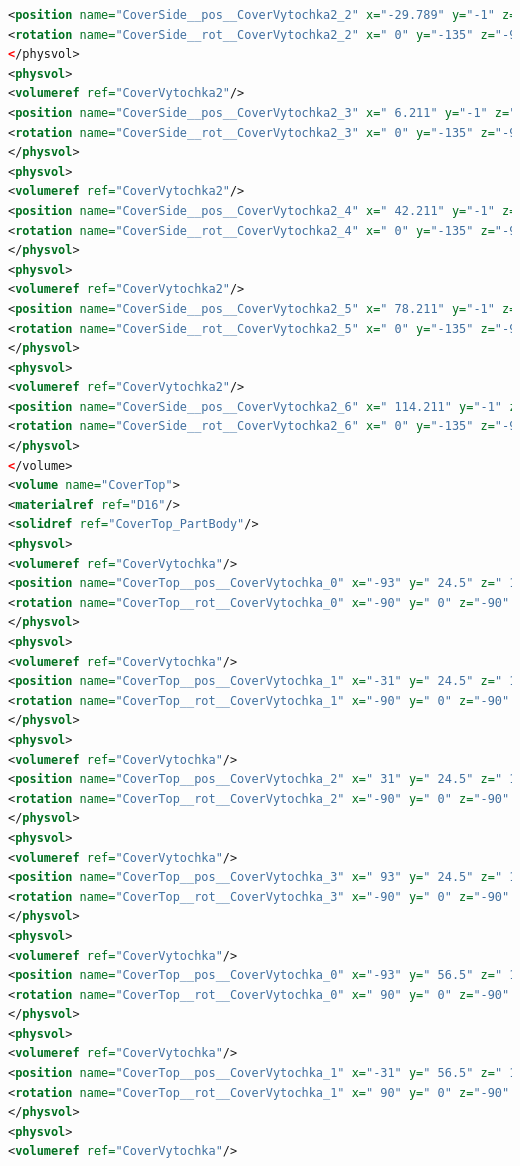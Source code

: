 \begin{lstlisting}[language=XML, firstline=1, lastline=89]
<position name="CoverSide__pos__CoverVytochka2_2" x="-29.789" y="-1" z="-20.499" unit="mm"/>
<rotation name="CoverSide__rot__CoverVytochka2_2" x=" 0" y="-135" z="-90" unit="deg"/>
</physvol>
<physvol>
<volumeref ref="CoverVytochka2"/>
<position name="CoverSide__pos__CoverVytochka2_3" x=" 6.211" y="-1" z="-20.499" unit="mm"/>
<rotation name="CoverSide__rot__CoverVytochka2_3" x=" 0" y="-135" z="-90" unit="deg"/>
</physvol>
<physvol>
<volumeref ref="CoverVytochka2"/>
<position name="CoverSide__pos__CoverVytochka2_4" x=" 42.211" y="-1" z="-20.499" unit="mm"/>
<rotation name="CoverSide__rot__CoverVytochka2_4" x=" 0" y="-135" z="-90" unit="deg"/>
</physvol>
<physvol>
<volumeref ref="CoverVytochka2"/>
<position name="CoverSide__pos__CoverVytochka2_5" x=" 78.211" y="-1" z="-20.499" unit="mm"/>
<rotation name="CoverSide__rot__CoverVytochka2_5" x=" 0" y="-135" z="-90" unit="deg"/>
</physvol>
<physvol>
<volumeref ref="CoverVytochka2"/>
<position name="CoverSide__pos__CoverVytochka2_6" x=" 114.211" y="-1" z="-20.499" unit="mm"/>
<rotation name="CoverSide__rot__CoverVytochka2_6" x=" 0" y="-135" z="-90" unit="deg"/>
</physvol>
</volume>
<volume name="CoverTop">
<materialref ref="D16"/>
<solidref ref="CoverTop_PartBody"/>
<physvol>
<volumeref ref="CoverVytochka"/>
<position name="CoverTop__pos__CoverVytochka_0" x="-93" y=" 24.5" z=" 1" unit="mm"/>
<rotation name="CoverTop__rot__CoverVytochka_0" x="-90" y=" 0" z="-90" unit="deg"/>
</physvol>
<physvol>
<volumeref ref="CoverVytochka"/>
<position name="CoverTop__pos__CoverVytochka_1" x="-31" y=" 24.5" z=" 1" unit="mm"/>
<rotation name="CoverTop__rot__CoverVytochka_1" x="-90" y=" 0" z="-90" unit="deg"/>
</physvol>
<physvol>
<volumeref ref="CoverVytochka"/>
<position name="CoverTop__pos__CoverVytochka_2" x=" 31" y=" 24.5" z=" 1" unit="mm"/>
<rotation name="CoverTop__rot__CoverVytochka_2" x="-90" y=" 0" z="-90" unit="deg"/>
</physvol>
<physvol>
<volumeref ref="CoverVytochka"/>
<position name="CoverTop__pos__CoverVytochka_3" x=" 93" y=" 24.5" z=" 1" unit="mm"/>
<rotation name="CoverTop__rot__CoverVytochka_3" x="-90" y=" 0" z="-90" unit="deg"/>
</physvol>
<physvol>
<volumeref ref="CoverVytochka"/>
<position name="CoverTop__pos__CoverVytochka_0" x="-93" y=" 56.5" z=" 1" unit="mm"/>
<rotation name="CoverTop__rot__CoverVytochka_0" x=" 90" y=" 0" z="-90" unit="deg"/>
</physvol>
<physvol>
<volumeref ref="CoverVytochka"/>
<position name="CoverTop__pos__CoverVytochka_1" x="-31" y=" 56.5" z=" 1" unit="mm"/>
<rotation name="CoverTop__rot__CoverVytochka_1" x=" 90" y=" 0" z="-90" unit="deg"/>
</physvol>
<physvol>
<volumeref ref="CoverVytochka"/>

\end{lstlisting}
